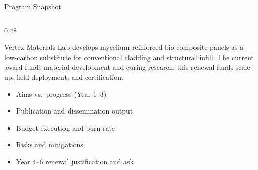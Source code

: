 \begin{frame}{Program Snapshot}
\begin{columns}[T,onlytextwidth]
\begin{column}{0.48\textwidth}
\begin{tcolorbox}[infobox, title=Project Summary]
Vertex Materials Lab develops mycelium-reinforced bio-composite panels
as a low-carbon substitute for conventional cladding and structural
infill. The current award funds material development and curing
research; this renewal funds scale-up, field deployment, and
certification.
\end{tcolorbox}
\par\vspace{2pt}
\begin{tcolorbox}[infobox, title=Today's Agenda]
\begin{itemize}[leftmargin=*, itemsep=0pt, topsep=0pt, parsep=0pt]
  \item Aims vs.\ progress (Year 1--3)
  \item Publication and dissemination output
  \item Budget execution and burn rate
  \item Risks and mitigations
  \item Year 4--6 renewal justification and ask
\end{itemize}
\end{tcolorbox}
\end{column}
\end{columns}
\end{frame}
